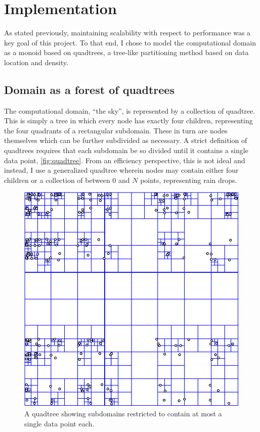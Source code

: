 \documentclass[twocolumn,a4paper,10pt]{article}
\begin{document}
\section{Implementation}


As stated previously, maintaining scalability with respect to performance was a
key goal of this project. To that end, I chose to model the computational domain
as a monoid based on quadtrees, a tree-like partitioning method based on data
location and density.

\subsection{Domain as a forest of quadtrees}

The computational domain, ``the sky'', is represented by a collection of
quadtree. This is simply a tree in which every node has exactly four children,
representing the four quadrants of a rectangular subdomain. These in turn are
nodes themselves which can be further subdivided as necessary. A strict
definition of quadtrees requires that each subdomain be so divided until it
contains a single data point, \autoref{fig:quadtree}. From an efficiency
perspective, this is not ideal and instead, I use a generalized quadtree wherein
nodes may contain either four children or a collection of between 0 and $N$
points, representing rain drops.

\begin{figure}[h]
    \centering
    \includegraphics[width=0.75\linewidth]{quadtree}
    \caption{A quadtree showing subdomains restricted to contain at most a
    single data point each.}
    \label{fig:quadtree}
\end{figure}
\end{document}
